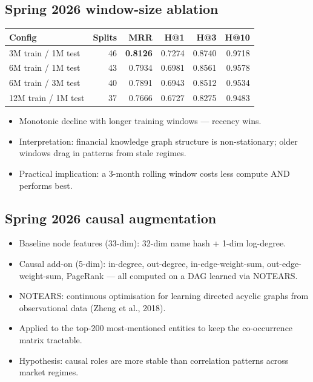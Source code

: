 \documentclass[11pt]{article}
\begin{document}
\subsection{Spring 2026 window-size ablation}

\begin{center}
\begin{tabular}{lrrrrr}
\toprule
\textbf{Config} & \textbf{Splits} & \textbf{MRR} & \textbf{H@1} & \textbf{H@3} & \textbf{H@10} \\
\midrule
3M train / 1M test  & 46 & \textbf{0.8126} & 0.7274 & 0.8740 & 0.9718 \\
6M train / 1M test  & 43 & 0.7934 & 0.6981 & 0.8561 & 0.9578 \\
6M train / 3M test  & 40 & 0.7891 & 0.6943 & 0.8512 & 0.9534 \\
12M train / 1M test & 37 & 0.7666 & 0.6727 & 0.8275 & 0.9483 \\
\bottomrule
\end{tabular}
\end{center}

\begin{itemize}
  \item Monotonic decline with longer training windows --- recency wins.
  \item Interpretation: financial knowledge graph structure is non-stationary; older windows drag in patterns from stale regimes.
  \item Practical implication: a 3-month rolling window costs less compute AND performs best.
\end{itemize}

\subsection{Spring 2026 causal augmentation}
\begin{itemize}
  \item Baseline node features (33-dim): 32-dim name hash + 1-dim log-degree.
  \item Causal add-on (5-dim): in-degree, out-degree, in-edge-weight-sum, out-edge-weight-sum, PageRank --- all computed on a DAG learned via NOTEARS.
  \item NOTEARS: continuous optimisation for learning directed acyclic graphs from observational data (Zheng et al., 2018).
  \item Applied to the top-200 most-mentioned entities to keep the co-occurrence matrix tractable.
  \item Hypothesis: causal roles are more stable than correlation patterns across market regimes.
\end{itemize}
\end{document}
